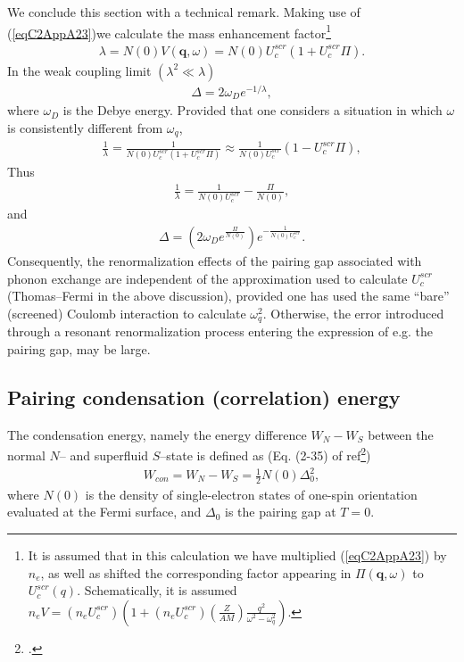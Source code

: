 We conclude this section with a technical remark. Making use of (\ref{eqC2AppA23})we calculate the mass enhancement factor\footnote{It is assumed that in this calculation we have multiplied (\ref{eqC2AppA23}) by $n_e$, as well as shifted the corresponding factor appearing in $\Pi(\mathbf q, \omega)$ to $U_c^{scr}(q)$. Schematically, it is assumed $n_eV=(n_e U_c^{scr})\left(1+(n_e U_c^{scr})\left(\frac{Z}{AM}\right)\frac{q^2}{\omega^2-\omega_q^2}\right)$.}
\begin{align}\label{eqC2AppA25}
\lambda=N(0)V(\mathbf q,\omega)=N(0)U^{scr}_c\left(1+U^{scr}_c\Pi\right).
\end{align}
In the weak coupling limit $(\lambda^2\ll\lambda)$
\begin{align}\label{eqC2AppA26}
\Delta=2\omega_De^{-1/\lambda},
\end{align}
where $\omega_D$ is the Debye energy.
  Provided that one considers  a situation in which $\omega$ is consistently different from $\omega_q$,
\begin{align}\label{eqC2AppA28}
\frac{1}{\lambda}=\frac{1}{N(0)U^{scr}_c\left(1+U^{scr}_c\Pi\right)}\approx\frac{1}{N(0)U^{scr}_c}\left(1-U^{scr}_c\Pi\right),
\end{align}
Thus
\begin{align}\label{eqC2AppA29}
\frac{1}{\lambda}=\frac{1}{N(0)U^{scr}_c}-\frac{\Pi}{N(0)},
\end{align}
and
\begin{align}\label{eqC2AppA30}
\Delta=\left(2\omega_De^{\frac{\Pi}{N(0)}}\right)e^{-\frac{1}{N(0)U^{scr}_c}}.
\end{align}
Consequently, the renormalization effects of the pairing gap associated with phonon exchange are independent of the approximation used to calculate $U^{scr}_c$ (Thomas--Fermi in the above discussion), provided one has used the same ``bare'' (screened) Coulomb interaction to calculate $\omega^2_q$.   Otherwise, the error introduced through a resonant renormalization process entering the expression of e.g. the pairing gap, may be  large.
\subsection{Pairing condensation (correlation) energy}



The condensation energy, namely the energy difference $W_N-W_S$ between the normal $N$-- and superfluid $S$--state is defined as (Eq. (2-35) of ref\footnote{\label{foot1}\cite{Schrieffer:64}.})
\begin{align}\label{eqC3AppA1}
W_{con}=W_N-W_S=\frac{1}{2}N(0)\Delta_0^2,
\end{align}
where $N(0)$ is the density of single-electron states of one-spin orientation evaluated at the Fermi surface, and $\Delta_0$ is the pairing gap at $T=0$.


